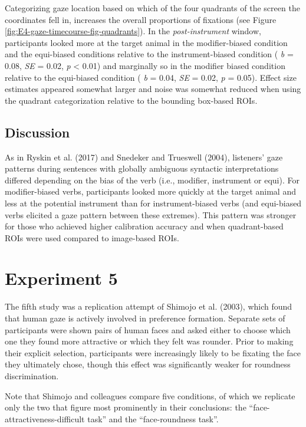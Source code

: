 \documentclass[
  man,floatsintext]{apa6}
\begin{document}
Categorizing gaze location based on which of the four quadrants of the screen the coordinates fell in, increases the overall proportions of fixations (see Figure \ref{fig:E4-gaze-timecourse-fig-quadrants}). In the \emph{post-instrument} window, participants looked more at the target animal in the modifier-biased condition and the equi-biased conditions relative to the instrument-biased condition ( \emph{b} = 0.08, \emph{SE} = 0.02, \emph{p} \textless{} 0.01) and marginally so in the modifier biased condition relative to the equi-biased condition ( \emph{b} = 0.04, \emph{SE} = 0.02, \emph{p} = 0.05). Effect size estimates appeared somewhat larger and noise was somewhat reduced when using the quadrant categorization relative to the bounding box-based ROIs.

\subsection{Discussion}\label{discussion-3}

As in Ryskin et al. (2017) and Snedeker and Trueswell (2004), listeners' gaze patterns during sentences with globally ambiguous syntactic interpretations differed depending on the bias of the verb (i.e., modifier, instrument or equi). For modifier-biased verbs, participants looked more quickly at the target animal and less at the potential instrument than for instrument-biased verbs (and equi-biased verbs elicited a gaze pattern between these extremes). This pattern was stronger for those who achieved higher calibration accuracy and when quadrant-based ROIs were used compared to image-based ROIs.

\section{Experiment 5}\label{experiment-5}

The fifth study was a replication attempt of Shimojo et al. (2003),
which found that human gaze is actively involved in preference
formation. Separate sets of participants were shown pairs of human faces
and asked either to choose which one they found more attractive or which
they felt was rounder. Prior to making their explicit selection,
participants were increasingly likely to be fixating the face they
ultimately chose, though this effect was significantly weaker for
roundness discrimination.

Note that Shimojo and colleagues compare five conditions, of which we
replicate only the two that figure most prominently in their
conclusions: the ``face-attractiveness-difficult task'' and the
``face-roundness task''.
\end{document}
